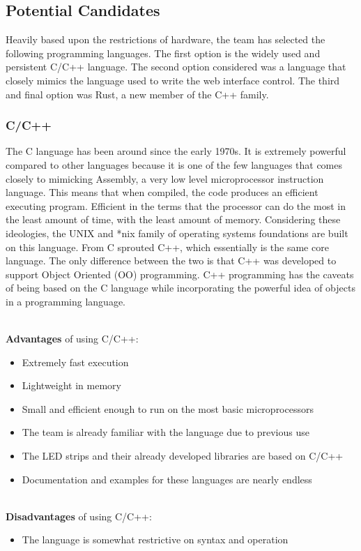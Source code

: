 		\subsection{Potential Candidates}
		Heavily based upon the restrictions of hardware, the team has selected the following programming languages.  The first option is the widely used and persistent C/C++ language.
		The second option considered was a language that closely mimics the language used to write the web interface control.  The third and final option was Rust, a new member of the
		C++ family.

		\subsubsection{C/C++}
		The C language has been around since the early 1970s. \cite{LANG1}  It is extremely powerful compared to other languages because it is one of the few languages that comes closely
		to mimicking Assembly, a very low level microprocessor instruction language.  This means that when compiled, the code produces an efficient executing program.  Efficient in the terms
		that the processor can do the most in the least amount of time, with the least amount of memory. Considering these ideologies, the UNIX and *nix family of operating systems
		foundations are built on this language.  From C sprouted C++, which essentially is the same core language.  The only difference between the two is that C++ was developed to support Object Oriented (OO) programming.  C++ programming has the caveats of
		being based on the C language while incorporating the powerful idea of objects in a programming language.

		\noindent \\ \textbf{Advantages} of using C/C++:
		\begin{itemize}
			\item Extremely fast execution
			\item Lightweight in memory
			\item Small and efficient enough to run on the most basic microprocessors
			\item The team is already familiar with the language due to previous use
			\item The LED strips and their already developed libraries are based on C/C++
			\item Documentation and examples for these languages are nearly endless
		\end{itemize}

		\noindent \\ \textbf{Disadvantages} of using C/C++:
		\begin{itemize}
			\item The language is somewhat restrictive on syntax and operation
		\end{itemize}


